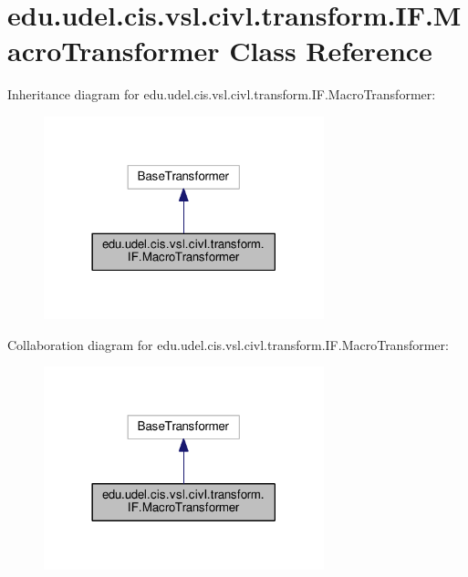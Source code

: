 \hypertarget{classedu_1_1udel_1_1cis_1_1vsl_1_1civl_1_1transform_1_1IF_1_1MacroTransformer}{}\section{edu.\+udel.\+cis.\+vsl.\+civl.\+transform.\+I\+F.\+Macro\+Transformer Class Reference}
\label{classedu_1_1udel_1_1cis_1_1vsl_1_1civl_1_1transform_1_1IF_1_1MacroTransformer}


Inheritance diagram for edu.\+udel.\+cis.\+vsl.\+civl.\+transform.\+I\+F.\+Macro\+Transformer\+:
\nopagebreak
\begin{figure}[H]
\begin{center}
\leavevmode
\includegraphics[width=230pt]{classedu_1_1udel_1_1cis_1_1vsl_1_1civl_1_1transform_1_1IF_1_1MacroTransformer__inherit__graph}
\end{center}
\end{figure}


Collaboration diagram for edu.\+udel.\+cis.\+vsl.\+civl.\+transform.\+I\+F.\+Macro\+Transformer\+:
\nopagebreak
\begin{figure}[H]
\begin{center}
\leavevmode
\includegraphics[width=230pt]{classedu_1_1udel_1_1cis_1_1vsl_1_1civl_1_1transform_1_1IF_1_1MacroTransformer__coll__graph}
\end{center}
\end{figure}
